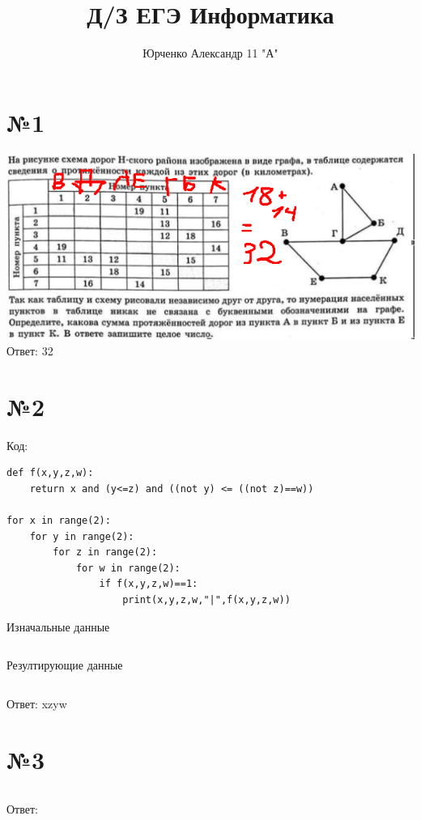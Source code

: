 \documentclass[12pt]{article}
\title{\textbf{Д/З ЕГЭ Информатика}}
\author{Юрченко Александр 11 "А"}
\date{}
\begin{document}
\maketitle
\thispagestyle{empty}
\section*{№1}
\includegraphics[scale=0.5]{first.png}
Ответ: 32

\section*{№2}
Код:
\begin{verbatim}
def f(x,y,z,w):
    return x and (y<=z) and ((not y) <= ((not z)==w))

for x in range(2):
    for y in range(2):
        for z in range(2):
            for w in range(2):
                if f(x,y,z,w)==1:
                    print(x,y,z,w,"|",f(x,y,z,w))
\end{verbatim}
Изначальные данные
\begin{verbatim}
\end{verbatim}
\pagebreak
Резултирующие данные
\begin{verbatim}
\end{verbatim}
Ответ: xzyw


\section*{№3}
\begin{verbatim}
\end{verbatim}
Ответ:
\end{document}
